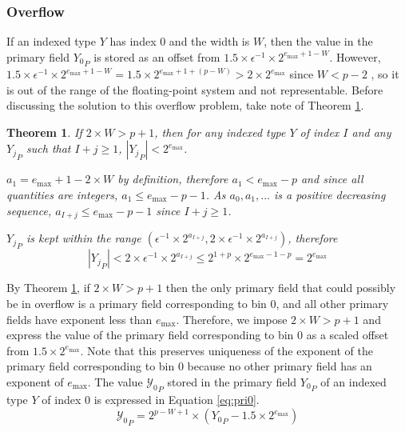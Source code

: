 \documentclass[12pt]{article}
\providecommand{\max}{\ensuremath{\text{max}}}
\theoremstyle{plain}
\newtheorem{thm}{Theorem}[section]
\begin{document}
    \subsubsection{Overflow}
      \label{sec:overflow}
      If an indexed type $Y$ has index 0 and the width is $W$, then the value in the primary field ${Y_0}_P$ is stored as an offset from $1.5\times\epsilon^{-1}\times2^{e_{\max} + 1 - W}$. However, $1.5\times\epsilon^{-1}\times2^{e_{\max} + 1 - W} = 1.5 \times 2^{e_{\max} + 1 + (p - W)} > 2 \times 2^{e_{\max}}$ since $W < p - 2$ \cite{repsum}, so it is out of the range of the floating-point system and not representable. Before discussing the solution to this overflow problem, take note of Theorem \ref{thm:overflow}.
      \begin{thm}
        If $2\times W > p + 1$, then for any indexed type $Y$ of index $I$ and any ${Y_j}_P$ such that $I + j \geq 1$, $|{Y_j}_P| < 2^{e_{\max}}$.

        $a_1 = e_{\max} + 1 - 2\times W$ by definition, therefore $a_1 < e_{\max} - p$ and since all quantities are integers, $a_1 \leq e_{\max} - p - 1$. As $a_0, a_1, ...$ is a positive decreasing sequence, $a_{I + j} \leq e_{\max} - p - 1$ since $I + j \geq 1$.

        ${Y_j}_P$ is kept within the range $(\epsilon^{-1} \times 2^{a_{I + j}}, 2 \times \epsilon^{-1} \times 2^{a_{I + j}})$, therefore
        \begin{equation*}
        |{Y_j}_P| < 2 \times \epsilon^{-1} \times 2^{a_{I + j}} \leq 2^{1 + p} \times 2^{e_{\max} - 1 - p} = 2^{e_{\max}}
        \end{equation*}

        \label{thm:overflow}
      \end{thm}
      By Theorem \ref{thm:overflow}, if $2\times W > p + 1$ then the only primary field that could possibly be in overflow is a primary field corresponding to bin 0, and all other primary fields have exponent less than $e_{\max}$. Therefore, we impose $2\times W > p + 1$ and express the value of the primary field corresponding to bin 0 as a scaled offset from $1.5\times2^{e_{\max}}$. Note that this preserves uniqueness of the exponent of the primary field corresponding to bin 0 because no other primary field has an exponent of $e_{\max}$. The value ${\mathcal{Y}_0}_P$ stored in the primary field ${Y_0}_P$ of an indexed type $Y$ of index 0 is expressed in Equation \ref{eq:pri0}.
      \begin{equation}
        {\mathcal{Y}_0}_P = 2^{p - W + 1}\times({Y_0}_P - 1.5\times2^{e_{\max}})
        \label{eq:pri0}
      \end{equation}
\end{document}
